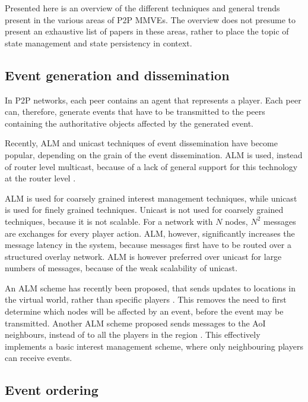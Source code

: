 Presented here is an overview of the different techniques and general trends present in the various areas of P2P MMVEs. The overview does not presume to present an exhaustive list of papers in these
areas, rather to place the topic of state management and state persistency in context.


\subsection{Event generation and dissemination}

In P2P networks, each peer contains an agent that represents a player. Each peer can, therefore, generate events that have to be transmitted to the peers containing the authoritative objects affected by the generated event.

Recently, ALM and unicast techniques of event dissemination have become popular, depending on the grain of the event dissemination. ALM is used, instead of router level multicast, because of a lack of general support for this technology at the router level \cite{ip_multicast_deployment_issues}.

ALM is used for coarsely grained interest management techniques, while unicast is used for finely grained techniques. Unicast is not used for
coarsely grained techniques, because it is not scalable. For a network with $N$ nodes, $N^2$ messages are exchanges for every player action. ALM,
however, significantly increases the message latency in the system, because messages first have to be routed over a structured overlay network. ALM
is however preferred over unicast for large numbers of messages, because of the weak scalability of unicast.

An ALM scheme has recently been proposed, that sends updates to locations in the virtual world, rather than specific players
\cite{Ghaffari_Delaunay_churn_mobility}. This removes the need to first determine which nodes will be affected by an event, before the event may be
transmitted. Another ALM scheme proposed sends messages to the AoI neighbours, instead of to all the players in the region
\cite{Seeger_area_based_gossip_multicast}. This effectively implements a basic interest management scheme, where only neighbouring players can
receive events.

\subsection{Event ordering}

